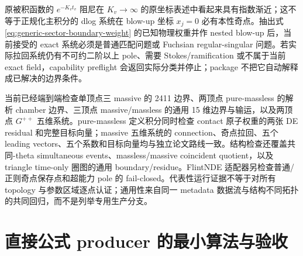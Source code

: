 \documentclass[11pt,a4paper]{ctexart}
\begin{document}
原被积函数的 $e^{-K_vt_v}$ 阻尼在 $K_v\to\infty$ 的原坐标表述中看起来具有指数渐近；这不等于正规化主积分的 dlog 系统在 blow-up 坐标 $x_j=0$ 必有本性奇点。抽出式 \eqref{eq:generic-sector-boundary-weight} 的已知物理权重并作 nested blow-up 后，当前接受的 exact 系统必须是普通匹配问题或 Fuchsian regular-singular 问题。若实际拉回系统仍有不可约二阶以上 pole、需要 Stokes/ramification 或不属于当前 exact field，capability preflight 会返回实际分类并停止；package 不把它自动解释成已解决的边界条件。

当前已经端到端检查单顶点三 massive 的 2411 边界、两顶点 pure-massless 的解析 chamber 边界、三顶点 massive/massless 的通用 15 维边界与输运，以及两顶点 $G^{++}$ 五维系统。pure-massless 定义积分同时检查 contact 原子权重的两张 DE residual 和完整目标向量；massive 五维系统的 connection、奇点拉回、五个 leading vectors、五个系数和目标向量均与独立论文路线一致。结构检查还覆盖共同-theta simultaneous events、massless/massive coincident quotient，以及 triangle time-only 圈图的通用 boundary/residue。FlintNDE 适配器另检查普通/正则奇点保存点和超能力 pole 的 fail-closed。代表性运行证据不等于对所有 topology 与参数区域逐点认证；通用性来自同一 metadata 数据流与结构不同拓扑的共同回归，而不是列举专用生产分支。

\section{直接公式 producer 的最小算法与验收}
\end{document}
